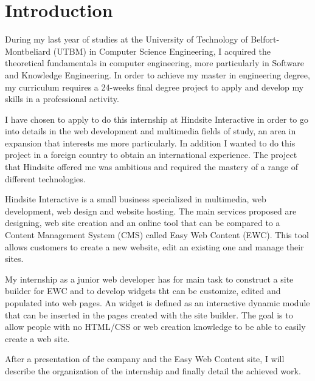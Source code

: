 \chapter*{Introduction}

During my last year of studies at the University of Technology of Belfort-
Montbeliard (UTBM) in Computer Science Engineering, I acquired the
theoretical fundamentals in computer engineering, more particularly in
Software and Knowledge Engineering. In order to achieve my master in
engineering degree, my curriculum requires a 24-weeks final degree project to
apply and develop my skills in a professional activity.

I have chosen to apply to do this internship at Hindsite Interactive in order to
go into details in the web development and multimedia fields of study, an area
in expansion that interests me more particularly. In addition I wanted to do this
project in a foreign country to obtain an international experience. The project that
Hindsite offered me was ambitious and required the mastery of a range of
different technologies.

Hindsite Interactive is a small business specialized in multimedia, web
development, web design and website hosting. The main services proposed
are designing, web site creation and an online tool that can be compared to a
Content Management System (CMS) called Easy Web Content (EWC). This
tool allows customers to create a new website, edit an existing one and
manage their sites.

My internship as a junior web developer has for main task to construct a site builder for EWC and to develop widgets tht can be customize, edited and populated into web pages. An widget is defined as an interactive
dynamic module that can be inserted in the pages created with the site builder. The goal is
to allow people with no HTML/CSS or web creation knowledge to be able to easily create a web site.

After a presentation of the company and the Easy Web Content site, I will
describe the organization of the internship and finally detail the achieved work.

\clearpage
